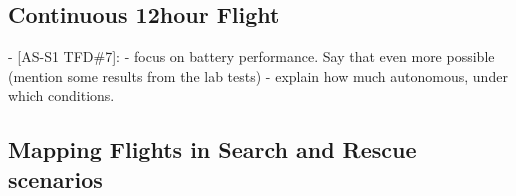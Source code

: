\subsection{Continuous 12hour Flight}
  
   - [AS-S1 TFD\#7]:
   - focus on battery performance. Say that even more possible (mention some results from the lab tests)
   - explain how much autonomous, under which conditions.
  
\subsection{Mapping Flights in Search and Rescue scenarios}


